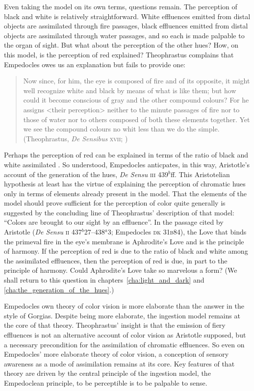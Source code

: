 Even taking the model on its own terms, questions remain. The perception of black and white is relatively straightforward. White effluences emitted from distal objects are assimilated through fire passages, black effluences emitted from distal objects are assimilated through water passages, and so each is made palpable to the organ of sight. But what about the perception of the other hues? How, on this model, is the perception of red explained? Theophrastus complains that Empedocles owes us an explanation but fails to provide one:
\begin{quote}
	Now since, for him, the eye is composed of fire and of its opposite, it might well recognize white and black by means of what is like them; but how could it become conscious of gray and the other compound colours? For he assigns <their perception> neither to the minute passages of fire nor to those of water nor to others composed of both these elements together. Yet we see the compound colours no whit less than we do the simple. (Theophrastus, \emph{De Sensibus} \textsc{xvii}; \citealt[81]{Stratton:1917vn})
\end{quote}
Perhaps the perception of red can be explained in terms of the ratio of black and white assimilated \citep{Ierodiakonou:2005fk}. So understood, Empedocles anticpates, in this way, Aristotle's account of the generation of the hues, \emph{De Sensu} \textsc{iii} 439\( ^{b} \)ff. This Aristotelian hypothesis at least has the virtue of explaining the perception of chromatic hues only in terms of elements already present in the model. That the elements of the model should prove sufficient for the perception of color quite generally is suggested by the concluding line of Theophrastus' description of that model: ``Colors are brought to our sight by an effluence''. In the passage cited by Aristotle (\emph{De Sensu} \textsc{ii} 437\( ^{b} \)27--438\( ^{a} \)3; Empedocles \textsc{dk} 31\textsc{b}84), the Love that binds the primeval fire in the eye's membrane is Aphrodite's Love and is the principle of harmony. If the perception of red is due to the ratio of black and white among the assimilated effluences, then the perception of red is due, in part to the principle of harmony. Could Aphrodite's Love take so marvelous a form? (We shall return to this question in chapters~\ref{cha:light_and_dark} and \ref{cha:the_generation_of_the_hues}.)

Empedocles own theory of color vision is more elaborate than the answer in the style of Gorgias. Despite being more elaborate, the ingestion model remains at the core of that theory. Theophrastus' insight is that the emission of fiery effluences is not an alternative account of color vision as Aristotle supposed, but a necessary precondition for the assimilation of chromatic effluences. So even on Empedocles' more elaborate theory of color vision, a conception of sensory awareness as a mode of assimilation remains at its core. Key features of that theory are driven by the central principle of the ingestion model, the Empedoclean principle, to be perceptible is to be palpable to sense.

